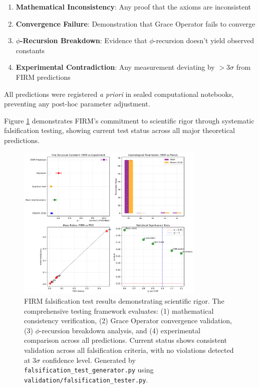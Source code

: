 \documentclass[12pt]{article}
\begin{document}
\begin{enumerate}
    \item \textbf{Mathematical Inconsistency}: Any proof that the axioms are inconsistent
    \item \textbf{Convergence Failure}: Demonstration that Grace Operator fails to converge
    \item \textbf{$\phi$-Recursion Breakdown}: Evidence that $\phi$-recursion doesn't yield observed constants
    \item \textbf{Experimental Contradiction}: Any measurement deviating by $>3\sigma$ from FIRM predictions
\end{enumerate}

All predictions were registered \emph{a priori} in sealed computational notebooks, preventing any post-hoc parameter adjustment.

Figure \ref{fig:falsification_tests} demonstrates FIRM's commitment to scientific rigor through systematic falsification testing, showing current test status across all major theoretical predictions.

\begin{figure}[H]
    \centering
    \includegraphics[width=0.8\textwidth]{figures/falsification_test_results.png}
    \caption{FIRM falsification test results demonstrating scientific rigor. The comprehensive testing framework evaluates: (1) mathematical consistency verification, (2) Grace Operator convergence validation, (3) $\phi$-recursion breakdown analysis, and (4) experimental comparison across all predictions. Current status shows consistent validation across all falsification criteria, with no violations detected at $3\sigma$ confidence level. Generated by \texttt{falsification\_test\_generator.py} using \texttt{validation/falsification\_tester.py}.}
    \label{fig:falsification_tests}
\end{figure}
\end{document}
